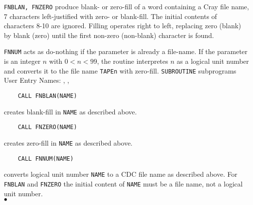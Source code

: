                             
                             
\Submitter{}                                 
                           
{\tt FNBLAN, FNZERO} produce blank- or zero-fill of
a word containing a Cray file name, 7 characters left-justified
with zero- or blank-fill. The initial contents of characters
8-10 are ignored. Filling operates right to left, replacing
zero (blank) by blank (zero) until the first non-zero
(non-blank) character is found.
\par
{\tt FNNUM} acts as do-nothing if the parameter
is already a file-name. If the parameter is an integer $n$ with
$0 < n < 99$, the routine interpretes $n$ as a logical unit number
and converts it to the file name {\tt TAPEn} with zero-fill.
\Structure
{\tt SUBROUTINE} subprograms \\
User Entry Names: , , 
\Usage
\begin{verbatim}
    CALL FNBLAN(NAME)
\end{verbatim}
creates blank-fill in {\tt NAME} as described above.
\begin{verbatim}
    CALL FNZERO(NAME)
\end{verbatim}
creates zero-fill in {\tt NAME} as described above.
\begin{verbatim}
    CALL FNNUM(NAME)
\end{verbatim}
converts logical unit number {\tt NAME} to a CDC file name as described
above.
\Notes
For {\tt FNBLAN} and {\tt FNZERO} the initial content of {\tt NAME}
must be a
file name, not a logical unit number.
\\ $\bullet$
